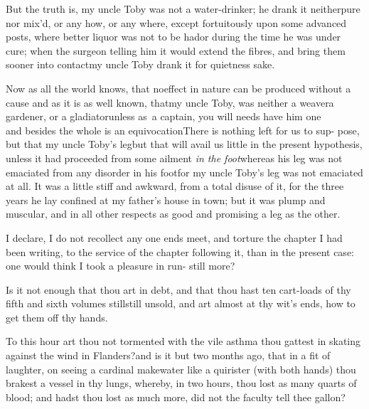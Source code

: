 \documentclass{article}
\begin{document}
But the truth is, my uncle Toby was not a water-drinker;
he drank it neither\break pure nor mix’d, or any how, or any where,
except fortuitously upon some advanced posts, where better liquor
was not to be had\tsh or during the time he was under
cure; when the surgeon telling him it would extend the fibres, and
bring them sooner into contact\tsh my uncle Toby
drank it for quietness sake.

Now as all the world knows, that no\break effect in nature can be
produced without a cause and as it is as well known, that\break my uncle
Toby, was neither a weaver\tsk\break a gardener, or a
gladiator\tsk unless as~a captain, you will needs have him
one\tsk\break
{}\\
and besides the whole is an equivocation\break\tsh There is nothing left for
us to sup- 
pose, but that my uncle Toby’s leg\tsh but that will avail us little in the present
hypothesis, unless it had proceeded from some ailment \textit{in the
foot}\tsk whereas his leg was not emaciated from any disorder
in his foot\tsk for my uncle Toby’s leg was not
emaciated at all. It was a little stiff and awkward, from a total
disuse of it, for the three years he lay confined at my
father’s house in town; but it was plump and muscular, and in
all other respects as good and promising a leg as the other.

I declare, I do not recollect any one\break
{} 
ends meet, and torture the chapter I had been writing, to the
service of the chapter following it, than in the present case:
one would think I took a pleasure in run-\sic{} 
still more?


Is it not enough that thou art in debt, and that thou hast ten
cart-loads of thy fifth and sixth volumes still\tsk still
unsold, and art almost at thy wit’s ends, how to get them off
thy hands.


To this hour art thou not tormented with the vile asthma
thou gattest in skating against the wind in Flanders?\break and is
it but two months ago, that in a fit of laughter, on seeing a
cardinal make\break water like a quirister (with both hands) thou brakest
a vessel in thy lungs, where\-by, in two hours, thou lost as many
quarts of blood; and hadst thou lost as much more, did not the
faculty tell thee\break
{}
gallon?\tsh
\end{document}
